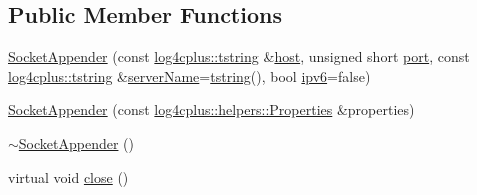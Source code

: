 \subsection*{Public Member Functions}
\begin{DoxyCompactItemize}
\item 
\hyperlink{classlog4cplus_1_1SocketAppender_a8eb4ca3fad9c278a56aff116a70e0074}{Socket\-Appender} (const \hyperlink{namespacelog4cplus_a3c9287f6ebcddc50355e29d71152117b}{log4cplus\-::tstring} \&\hyperlink{classlog4cplus_1_1SocketAppender_a6bdd29292be3aeb572d136e808d0012c}{host}, unsigned short \hyperlink{classlog4cplus_1_1SocketAppender_a26142f3cac36979c29f75f211e5a712b}{port}, const \hyperlink{namespacelog4cplus_a3c9287f6ebcddc50355e29d71152117b}{log4cplus\-::tstring} \&\hyperlink{classlog4cplus_1_1SocketAppender_a185846efa2514d35f6009091a047a57e}{server\-Name}=\hyperlink{namespacelog4cplus_a3c9287f6ebcddc50355e29d71152117b}{tstring}(), bool \hyperlink{classlog4cplus_1_1SocketAppender_a4c89e1a58c466826ea6964bbd452539b}{ipv6}=false)
\item 
\hyperlink{classlog4cplus_1_1SocketAppender_aa86c90e18e2c05d395eb526188ff78ab}{Socket\-Appender} (const \hyperlink{classlog4cplus_1_1helpers_1_1Properties}{log4cplus\-::helpers\-::\-Properties} \&properties)
\item 
\hyperlink{classlog4cplus_1_1SocketAppender_a9440ece884ae3eb4d6fdfdc9d0ab0cb5}{$\sim$\-Socket\-Appender} ()
\item 
virtual void \hyperlink{classlog4cplus_1_1SocketAppender_a8acf42d7faa6d9b7a63f3004532516cd}{close} ()
\end{DoxyCompactItemize}
